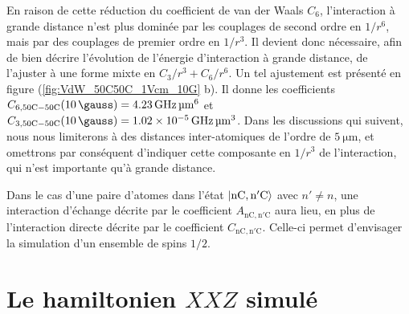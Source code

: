 En raison de cette réduction du coefficient de van der Waals $C_6$, l'interaction à grande distance n'est plus dominée par les couplages de second ordre en $1/r^6$, mais par des couplages de premier ordre en $1/r^3$.
Il devient donc nécessaire, afin de bien décrire l'évolution de l'énergie d'interaction à grande distance, de l'ajuster à une forme mixte en $C_3/r^3 + C_6/r^6$.
Un tel ajustement est présenté en figure (\ref{fig:VdW_50C50C_1Vcm_10G} b).
Il donne les coefficients $C_{6,\mathrm{50C-50C}}(\SI{10}{\gauss}) = \SI{4.23}{\GHz\raiseto{6}\um}$ et $C_{3,\mathrm{50C-50C}}(\SI{10}{\gauss}) = \SI{1.02e-5}{\GHz\raiseto{3}\um}$.
Dans les discussions qui suivent, nous nous limiterons à des distances inter-atomiques de l'ordre de $\SI{5}{\um}$, et omettrons par conséquent d'indiquer cette composante en $1/r^3$ de l'interaction, qui n'est importante qu'à grande distance.

Dans le cas d'une paire d'atomes dans l'état $\ket{\mathrm{nC,n'C}}$ avec $n'\neq n$, une interaction d'échange décrite par le coefficient $A_{\mathrm{nC},\mathrm{n'C}}$ aura lieu, en plus de l'interaction directe décrite par le coefficient $C_{\mathrm{nC},\mathrm{n'C}}$.
Celle-ci permet d'envisager la simulation d'un ensemble de spins $1/2$.

\section{Le hamiltonien $XXZ$ simulé}
\newcommand{\CnCnC}{C_{\mathrm{nC},\mathrm{nC}}}
\newcommand{\CnpCnpC}{C_{\mathrm{n'C},\mathrm{n'C}}}
\newcommand{\CnCnpC}{C_{\mathrm{nC},\mathrm{n'C}}}
\newcommand{\AnCnpC}{A_{\mathrm{nC},\mathrm{n'C}}}

